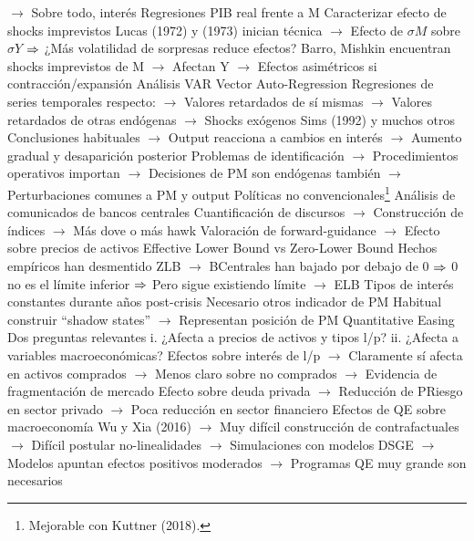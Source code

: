 \documentclass{nuevotema}
\begin{document}
\begin{esquemal}
				\4[] $\to$ Sobre todo, interés
				\4 Regresiones PIB real frente a M
				\4[] Caracterizar efecto de shocks imprevistos
				\4[] Lucas (1972) y (1973) inician técnica
				\4[] $\to$ Efecto de $\sigma M$ sobre $\sigma Y$
				\4[] $\Rightarrow$ ¿Más volatilidad de sorpresas reduce efectos?
				\4[] Barro, Mishkin encuentran shocks imprevistos de M
				\4[] $\to$ Afectan Y
				\4[] $\to$ Efectos asimétricos si contracción/expansión
				\4 Análisis VAR
				\4[] Vector Auto-Regression
				\4[] Regresiones de series temporales respecto:
				\4[] $\to$ Valores retardados de sí mismas
				\4[] $\to$ Valores retardados de otras endógenas
				\4[] $\to$ Shocks exógenos
				\4[] Sims (1992) y muchos otros
				\4[] Conclusiones habituales
				\4[] $\to$ Output reacciona a cambios en interés
				\4[] $\to$ Aumento gradual y desaparición posterior
				\4[] Problemas de identificación
				\4[] $\to$ Procedimientos operativos importan
				\4[] $\to$ Decisiones de PM son endógenas también
				\4[] $\to$ Perturbaciones comunes a PM y output
			\3 Políticas no convencionales\footnote{Mejorable con Kuttner (2018).}
				\4 Análisis de comunicados de bancos centrales
				\4[] Cuantificación de discursos
				\4[] $\to$ Construcción de índices
				\4[] $\to$ Más dove o más hawk
				\4[] Valoración de forward-guidance
				\4[] $\to$ Efecto sobre precios de activos
				\4 Effective Lower Bound vs Zero-Lower Bound
				\4[] Hechos empíricos han desmentido ZLB
				\4[] $\to$ BCentrales han bajado por debajo de 0
				\4[] $\Rightarrow$ 0 no es el límite inferior
				\4[] $\Rightarrow$ Pero sigue existiendo límite $\to$ ELB
				\4 Tipos de interés constantes durante años post-crisis
				\4[] Necesario otros indicador de PM
				\4[] Habitual construir ``shadow states''
				\4[] $\to$ Representan posición de PM
				\4 Quantitative Easing
				\4[] Dos preguntas relevantes
				\4[] i. ¿Afecta a precios de activos y tipos l/p?
				\4[] ii. ¿Afecta a variables macroeconómicas?
				\4[] Efectos sobre interés de l/p
				\4[] $\to$ Claramente sí afecta en activos comprados
				\4[] $\to$ Menos claro sobre no comprados
				\4[] $\to$ Evidencia de fragmentación de mercado
				\4[] Efecto sobre deuda privada
				\4[] $\to$ Reducción de PRiesgo en sector privado
				\4[] $\to$ Poca reducción en sector financiero
				\4[] Efectos de QE sobre macroeconomía
				\4[] Wu y Xia (2016)
				\4[] $\to$ Muy difícil construcción de contrafactuales
				\4[] $\to$ Difícil postular no-linealidades
				\4[] $\to$ Simulaciones con modelos DSGE
				\4[] $\to$ Modelos apuntan efectos positivos moderados
				\4[] $\to$ Programas QE muy grande son necesarios

\end{esquemal}
\end{document}
